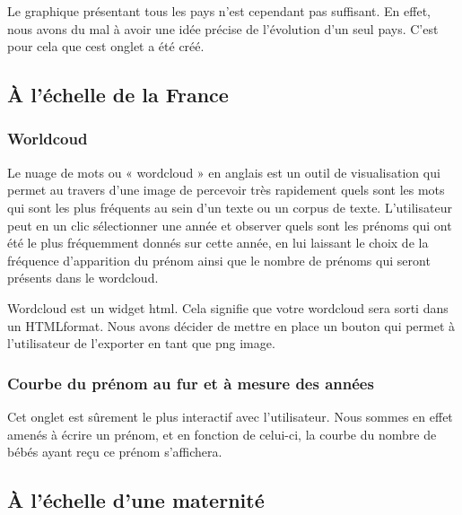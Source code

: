 \documentclass[
]{article}
\begin{document}
Le graphique présentant tous les pays n'est cependant pas suffisant. En
effet, nous avons du mal à avoir une idée précise de l'évolution d'un
seul pays. C'est pour cela que cest onglet a été créé.

\hypertarget{uxe0-luxe9chelle-de-la-france}{%
\subsection{À l'échelle de la
France}\label{uxe0-luxe9chelle-de-la-france}}

\hypertarget{worldcoud}{%
\subsubsection{Worldcoud}\label{worldcoud}}

Le nuage de mots ou « wordcloud » en anglais est un outil de
visualisation qui permet au travers d'une image de percevoir très
rapidement quels sont les mots qui sont les plus fréquents au sein d'un
texte ou un corpus de texte. L'utilisateur peut en un clic sélectionner
une année et observer quels sont les prénoms qui ont été le plus
fréquemment donnés sur cette année, en lui laissant le choix de la
fréquence d'apparition du prénom ainsi que le nombre de prénoms qui
seront présents dans le wordcloud.

Wordcloud est un widget html. Cela signifie que votre wordcloud sera
sorti dans un HTMLformat. Nous avons décider de mettre en place un
bouton qui permet à l'utilisateur de l'exporter en tant que png image.

\hypertarget{courbe-du-pruxe9nom-au-fur-et-uxe0-mesure-des-annuxe9es}{%
\subsubsection{Courbe du prénom au fur et à mesure des
années}\label{courbe-du-pruxe9nom-au-fur-et-uxe0-mesure-des-annuxe9es}}

Cet onglet est sûrement le plus interactif avec l'utilisateur. Nous
sommes en effet amenés à écrire un prénom, et en fonction de celui-ci,
la courbe du nombre de bébés ayant reçu ce prénom s'affichera.

\hypertarget{uxe0-luxe9chelle-dune-maternituxe9}{%
\subsection{À l'échelle d'une
maternité}\label{uxe0-luxe9chelle-dune-maternituxe9}}
\end{document}
